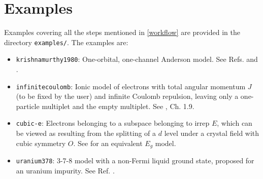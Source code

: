 \documentclass[notitlepage]{article}
\begin{document}
\section{Examples}
\label{examples}
Examples covering all the steps mentioned in \ref{workflow}
are provided in the directory \texttt{examples/}. The
examples are:
\begin{itemize}
    \item \texttt{krishnamurthy1980}: One-orbital,
        one-channel Anderson model. See Refs.
        \cite{krishna-murthy1980a} and
        \cite{krishna-murthy1980b}.
    \item \texttt{infinitecoulomb}: Ionic model of electrons
        with total angular momentum $J$ (to be fixed by the
        user) and infinite Coulomb repulsion, leaving only a
        one-particle multiplet and the empty multiplet. See
        \cite{hewson1997}, Ch. 1.9.
    \item \texttt{cubic-e}: Electrons belonging to a
        subspace belonging to irrep $E$, which can be viewed as
        resulting from the splitting of a $d$ level under a
        crystal field with cubic symmetry $O$. See
        \cite{calvo-fernandez2024} for an equivalent $E_g$
        model.
    \item \texttt{uranium378}: 3-7-8 model with a non-Fermi
        liquid ground state, proposed for an uranium
        impurity. See Ref. \cite{cox1987}.
\end{itemize}
\end{document}
